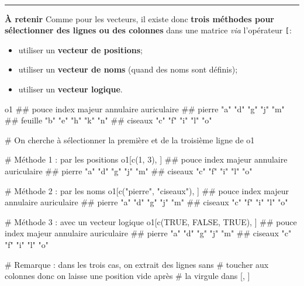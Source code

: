 \documentclass[12pt,twosided, notitlepage]{book}
\newenvironment{Shaded}{}{}
\newcommand{\KeywordTok}[1]{\textcolor[rgb]{0.00,0.00,1.00}{{#1}}}
\newcommand{\DecValTok}[1]{{#1}}
\newcommand{\StringTok}[1]{\textcolor[rgb]{0.00,0.50,0.50}{{#1}}}
\newcommand{\CommentTok}[1]{\textcolor[rgb]{0.00,0.50,0.00}{{#1}}}
\newcommand{\OtherTok}[1]{\textcolor[rgb]{1.00,0.25,0.00}{{#1}}}
\newcommand{\NormalTok}[1]{{#1}}
\providecommand{\tightlist}{%
  \setlength{\itemsep}{0pt}\setlength{\parskip}{0pt}}
\renewenvironment{Shaded}{\begin{snugshade}}{\end{snugshade}}
\begin{document}
~

\begin{center}\rule{0.5\linewidth}{\linethickness}\end{center}

\textbf{À retenir} Comme pour les vecteurs, il existe donc \textbf{trois
méthodes pour sélectionner des lignes ou des colonnes} dans une matrice
\emph{via} l'opérateur \texttt{{[}}\index{\texttt{[}}:

\begin{itemize}
\tightlist
\item
  utiliser un \textbf{vecteur de positions};
\item
  utiliser un \textbf{vecteur de noms} (quand des noms sont définis);
\item
  utiliser un \textbf{vecteur logique}.
\end{itemize}

\begin{Shaded}
\begin{Highlighting}[]
\NormalTok{o1}
  \NormalTok{##         pouce index majeur annulaire auriculaire}
  \NormalTok{## pierre  "a"   "d"   "g"    "j"       "m"        }
  \NormalTok{## feuille "b"   "e"   "h"    "k"       "n"        }
  \NormalTok{## ciseaux "c"   "f"   "i"    "l"       "o"}

\CommentTok{# On cherche à sélectionner la première et de la troisième ligne de o1}

\CommentTok{# Méthode 1 : par les positions}
\NormalTok{o1[}\KeywordTok{c}\NormalTok{(}\DecValTok{1}\NormalTok{, }\DecValTok{3}\NormalTok{), ]}
  \NormalTok{##         pouce index majeur annulaire auriculaire}
  \NormalTok{## pierre  "a"   "d"   "g"    "j"       "m"        }
  \NormalTok{## ciseaux "c"   "f"   "i"    "l"       "o"}

\CommentTok{# Méthode 2 : par les noms}
\NormalTok{o1[}\KeywordTok{c}\NormalTok{(}\StringTok{"pierre"}\NormalTok{, }\StringTok{"ciseaux"}\NormalTok{), ]}
  \NormalTok{##         pouce index majeur annulaire auriculaire}
  \NormalTok{## pierre  "a"   "d"   "g"    "j"       "m"        }
  \NormalTok{## ciseaux "c"   "f"   "i"    "l"       "o"}

\CommentTok{# Méthode 3 : avec un vecteur logique}
\NormalTok{o1[}\KeywordTok{c}\NormalTok{(}\OtherTok{TRUE}\NormalTok{, }\OtherTok{FALSE}\NormalTok{, }\OtherTok{TRUE}\NormalTok{), ]}
  \NormalTok{##         pouce index majeur annulaire auriculaire}
  \NormalTok{## pierre  "a"   "d"   "g"    "j"       "m"        }
  \NormalTok{## ciseaux "c"   "f"   "i"    "l"       "o"}

\CommentTok{# Remarque : dans les trois cas, on extrait des lignes sans}
\CommentTok{# toucher aux colonnes donc on laisse une position vide après}
\CommentTok{# la virgule dans [, ]}
\end{Highlighting}
\end{Shaded}
\end{document}
